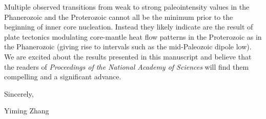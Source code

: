 \documentclass[11pt, letterpaper]{article}
\begin{document}
\begin{flushleft}
Multiple observed transitions from weak to strong paleointensity values in the Phanerozoic and the Proterozoic cannot all be the minimum prior to the beginning of inner core nucleation. Instead they likely indicate are the result of plate tectonics modulating core-mantle heat flow patterns in the Proterozoic as in the Phanerozoic (giving rise to intervals such as the mid-Paleozoic dipole low). We are excited about the results presented in this manuscript and believe that the readers of \textit{Proceedings of the National Academy of Sciences} will find them compelling and a significant advance.

Sincerely,

Yiming Zhang\\




 
 
% 






\end{flushleft}
\end{document}
